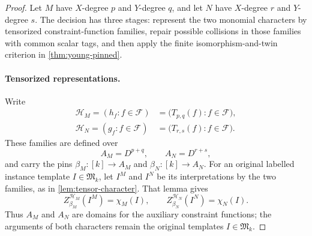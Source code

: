 \documentclass[11pt]{article}
\theoremstyle{plain}
\theoremstyle{definition}
\theoremstyle{remark}
\newcommand{\cF}{\mathcal F}
\newcommand{\InstMonoid}[1]{\mathfrak M_{#1}}
\begin{document}
\begin{proof}
Let $M$ have $X$-degree $p$ and $Y$-degree $q$, and let $N$ have
$X$-degree $r$ and $Y$-degree $s$.  The decision has three stages: represent
the two monomial characters by tensorized constraint-function families,
repair possible collisions in those families with common scalar tags, and
then apply the finite isomorphism-and-twin criterion in
\cref{thm:young-pinned}.

\paragraph{Tensorized representations.}
Write
\[
\begin{aligned}
  \mathcal H_M=(h_f:f\in\cF)
    &=\bigl(T_{p,q}(f):f\in\cF\bigr),\\
  \mathcal H_N=(g_f:f\in\cF)
    &=\bigl(T_{r,s}(f):f\in\cF\bigr).
\end{aligned}
\]
These families are defined over
\[
  A_M=D^{p+q},
  \qquad
  A_N=D^{r+s},
\]
and carry the pins $\beta_M:[k]\to A_M$ and
$\beta_N:[k]\to A_N$.  For an original labelled instance template
$I\in\InstMonoid{k}$, let $I^M$ and $I^N$ be its interpretations by the two
families, as in \cref{lem:tensor-character}.  That lemma gives
\begin{equation}
  Z_{\beta_M}^{\mathcal H_M}(I^M)=\chi_M(I),
  \qquad
  Z_{\beta_N}^{\mathcal H_N}(I^N)=\chi_N(I).
  \label{eq:two-monomial-realizations}
\end{equation}
Thus $A_M$ and $A_N$ are domains for the auxiliary constraint functions;
the arguments of both characters remain the original templates
$I\in\InstMonoid{k}$.


\end{proof}
\end{document}
